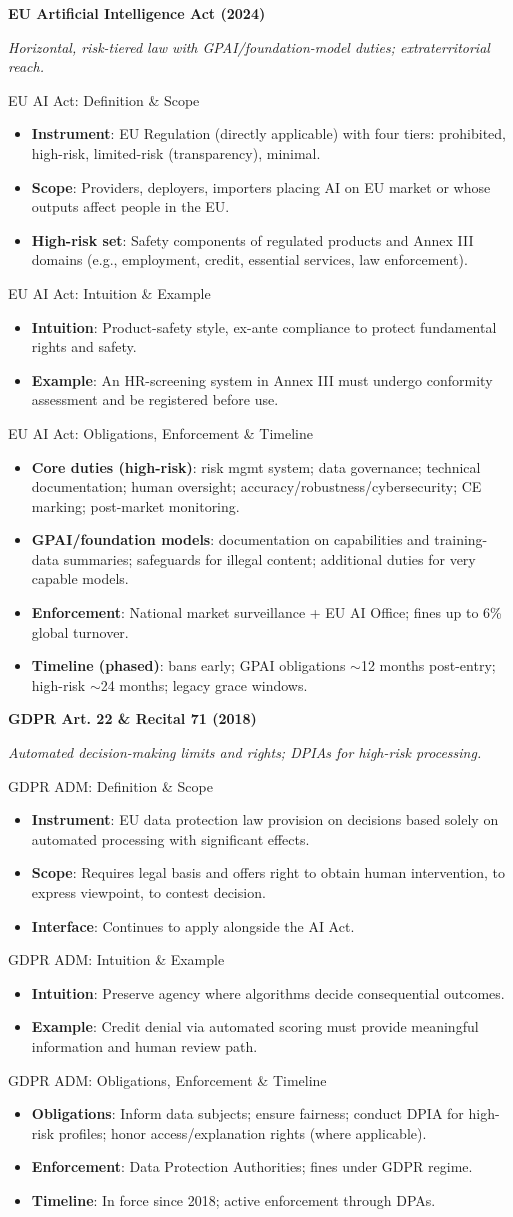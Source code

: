 \documentclass[aspectratio=169]{beamer}
\newcommand{\RegTitle}[2]{%
  \begin{frame}[plain]
    \centering
    \vfill
    {\usebeamerfont{title}\usebeamercolor[fg]{title}\LARGE \textbf{#1}\par}
    \vspace{0.4em}
    {\small \itshape #2\par}
    \vfill
  \end{frame}
}
\newcommand{\RegDef}[2]{%
  \begin{frame}{#1: Definition \& Scope}
    \begin{itemize}
      #2
    \end{itemize}
  \end{frame}
}
\newcommand{\RegIntuition}[2]{%
  \begin{frame}{#1: Intuition \& Example}
    \begin{itemize}
      #2
    \end{itemize}
  \end{frame}
}
\newcommand{\RegCompliance}[2]{%
  \begin{frame}{#1: Obligations, Enforcement \& Timeline}
    \begin{itemize}
      #2
    \end{itemize}
  \end{frame}
}
\begin{document}
\RegTitle{EU Artificial Intelligence Act (2024)}{Horizontal, risk-tiered law with GPAI/foundation-model duties; extraterritorial reach.}
\RegDef{EU AI Act}{%
  \item \textbf{Instrument}: EU Regulation (directly applicable) with four tiers: prohibited, high-risk, limited-risk (transparency), minimal.
  \item \textbf{Scope}: Providers, deployers, importers placing AI on EU market or whose outputs affect people in the EU.
  \item \textbf{High-risk set}: Safety components of regulated products and Annex III domains (e.g., employment, credit, essential services, law enforcement).
}
\RegIntuition{EU AI Act}{%
  \item \textbf{Intuition}: Product-safety style, ex-ante compliance to protect fundamental rights and safety.
  \item \textbf{Example}: An HR-screening system in Annex III must undergo conformity assessment and be registered before use.
}
\RegCompliance{EU AI Act}{%
  \item \textbf{Core duties (high-risk)}: risk mgmt system; data governance; technical documentation; human oversight; accuracy/robustness/cybersecurity; CE marking; post-market monitoring.
  \item \textbf{GPAI/foundation models}: documentation on capabilities and training-data summaries; safeguards for illegal content; additional duties for very capable models.
  \item \textbf{Enforcement}: National market surveillance + EU AI Office; fines up to 6\% global turnover.
  \item \textbf{Timeline (phased)}: bans early; GPAI obligations $\sim$12 months post-entry; high-risk $\sim$24 months; legacy grace windows.
}

\RegTitle{GDPR Art. 22 \& Recital 71 (2018)}{Automated decision-making limits and rights; DPIAs for high-risk processing.}
\RegDef{GDPR ADM}{%
  \item \textbf{Instrument}: EU data protection law provision on decisions based solely on automated processing with significant effects.
  \item \textbf{Scope}: Requires legal basis and offers right to obtain human intervention, to express viewpoint, to contest decision.
  \item \textbf{Interface}: Continues to apply alongside the AI Act.
}
\RegIntuition{GDPR ADM}{%
  \item \textbf{Intuition}: Preserve agency where algorithms decide consequential outcomes.
  \item \textbf{Example}: Credit denial via automated scoring must provide meaningful information and human review path.
}
\RegCompliance{GDPR ADM}{%
  \item \textbf{Obligations}: Inform data subjects; ensure fairness; conduct DPIA for high-risk profiles; honor access/explanation rights (where applicable).
  \item \textbf{Enforcement}: Data Protection Authorities; fines under GDPR regime.
  \item \textbf{Timeline}: In force since 2018; active enforcement through DPAs.
}
\end{document}
